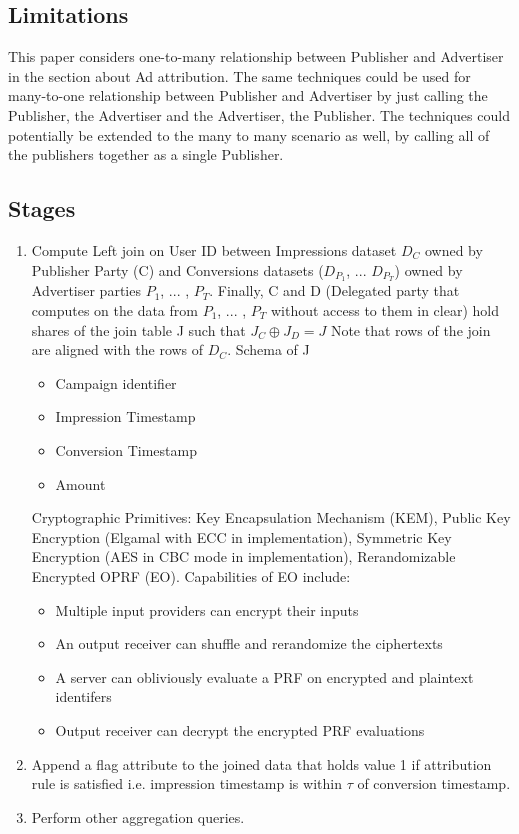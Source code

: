 \subsection{Limitations}
This paper considers one-to-many relationship between Publisher and Advertiser in the section about Ad attribution. The same techniques could be used for many-to-one relationship between Publisher and Advertiser by just calling the Publisher, the Advertiser and the Advertiser, the Publisher. The techniques could potentially be extended to the many to many scenario as well, by calling all of the publishers together as a single Publisher.

\subsection{Stages}
\begin{enumerate}
    \item Compute Left join on User ID between Impressions dataset $D_C$ owned by Publisher Party (C) and Conversions datasets ($D_{P_1}$, ... $D_{P_T}$) owned by Advertiser parties $P_1$, ... , $P_T$. Finally, C and D (Delegated party that computes on the data from $P_1$, ... , $P_T$ without access to them in clear) hold shares of the join table J such that $J_C \oplus J_D = J$ Note that rows of the join are aligned with the rows of $D_C$. Schema of J
    \begin{itemize}
        \item Campaign identifier
        \item Impression Timestamp
        \item Conversion Timestamp
        \item Amount
    \end{itemize}
    Cryptographic Primitives: Key Encapsulation Mechanism (KEM), Public Key Encryption (Elgamal with ECC in implementation), Symmetric Key Encryption (AES in CBC mode in implementation), Rerandomizable Encrypted OPRF (EO). Capabilities of EO include:
    \begin{itemize}
        \item Multiple input providers can encrypt their inputs
        \item An output receiver can shuffle and rerandomize the ciphertexts
        \item A server can obliviously evaluate a PRF on encrypted and plaintext identifers
        \item Output receiver can decrypt the encrypted PRF evaluations
    \end{itemize}
    \item Append a flag attribute to the joined data that holds value 1 if attribution rule is satisfied i.e. impression timestamp is within $\tau$ of conversion timestamp.
    \item Perform other aggregation queries.
\end{enumerate}

